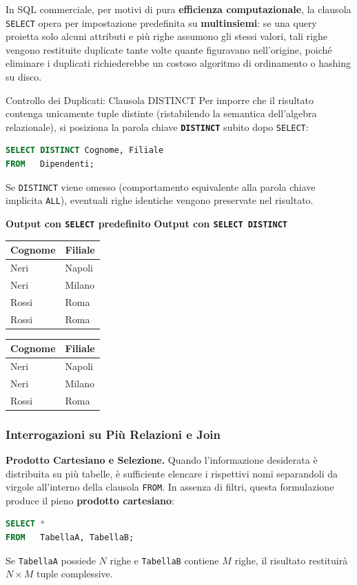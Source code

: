 \documentclass[12pt]{extarticle}
\begin{document}
\medskip
\noindent In SQL commerciale, per motivi di pura \textbf{efficienza computazionale}, la clausola \texttt{SELECT} opera per impostazione predefinita su \textbf{multinsiemi}: se una query proietta solo alcuni attributi e più righe assumono gli stessi valori, tali righe vengono restituite duplicate tante volte quante figuravano nell'origine, poiché eliminare i duplicati richiederebbe un costoso algoritmo di ordinamento o hashing su disco.

\begin{cbox}{Controllo dei Duplicati: Clausola DISTINCT}
\noindent Per imporre che il risultato contenga unicamente tuple distinte (ristabilendo la semantica dell'algebra relazionale), si posiziona la parola chiave \textbf{\texttt{DISTINCT}} subito dopo \texttt{SELECT}:
\begin{lstlisting}[language=SQL]
SELECT DISTINCT Cognome, Filiale
FROM   Dipendenti;
\end{lstlisting}
Se \texttt{DISTINCT} viene omesso (comportamento equivalente alla parola chiave implicita \texttt{ALL}), eventuali righe identiche vengono preservate nel risultato.
\end{cbox}

\begin{center}
\small
\textbf{Output con \texttt{SELECT} predefinito} \qquad \qquad \textbf{Output con \texttt{SELECT DISTINCT}} \\[1ex]
\begin{tabular}{ll}
    \toprule
    \textbf{Cognome} & \textbf{Filiale} \\
    \midrule
    Neri  & Napoli \\
    Neri  & Milano \\
    Rossi & Roma \\
    Rossi & Roma \\
    \bottomrule
\end{tabular}
\qquad \qquad
\begin{tabular}{ll}
    \toprule
    \textbf{Cognome} & \textbf{Filiale} \\
    \midrule
    Neri  & Napoli \\
    Neri  & Milano \\
    Rossi & Roma \\
    \bottomrule
\end{tabular}
\end{center}

\subsubsection{Interrogazioni su Più Relazioni e Join}
\noindent \textbf{Prodotto Cartesiano e Selezione.} Quando l'informazione desiderata è distribuita su più tabelle, è sufficiente elencare i rispettivi nomi separandoli da virgole all'interno della clausola \texttt{FROM}. In assenza di filtri, questa formulazione produce il pieno \textbf{prodotto cartesiano}:
\begin{lstlisting}[language=SQL]
SELECT *
FROM   TabellaA, TabellaB;
\end{lstlisting}
Se \texttt{TabellaA} possiede $N$ righe e \texttt{TabellaB} contiene $M$ righe, il risultato restituirà $N \times M$ tuple complessive.
\end{document}
